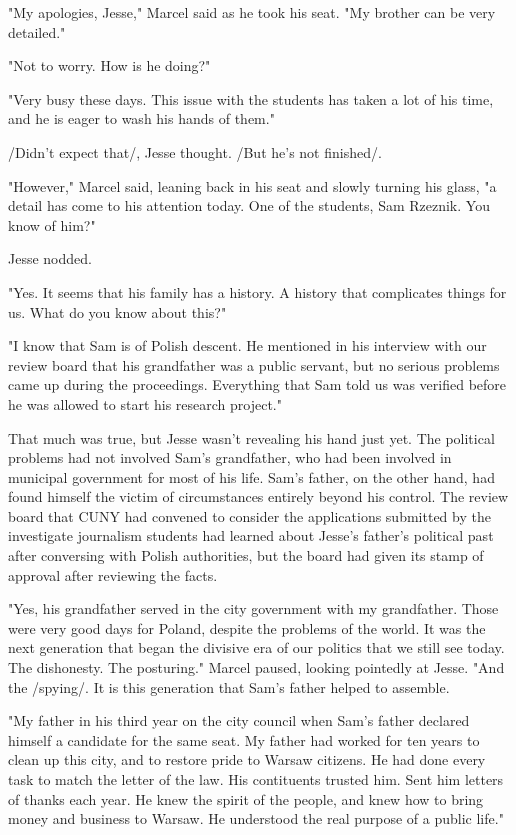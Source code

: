 "My apologies, Jesse," Marcel said as he took his seat.  "My brother can be very detailed."

"Not to worry.  How is he doing?"

"Very busy these days.  This issue with the students has taken a lot of his time, and he is eager to wash his hands of them."

/Didn't expect that/, Jesse thought.  /But he's not finished/.

"However," Marcel said, leaning back in his seat and slowly turning his glass, "a detail has come to his attention today.  One of the students, Sam Rzeznik.  You know of him?"

Jesse nodded.

"Yes.  It seems that his family has a history.  A history that complicates things for us.  What do you know about this?"

"I know that Sam is of Polish descent.  He mentioned in his interview with our review board that his grandfather was a public servant, but no serious problems came up during the proceedings.  Everything that Sam told us was verified before he was allowed to start his research project."

That much was true, but Jesse wasn't revealing his hand just yet.  The political problems had not involved Sam's grandfather, who had been involved in municipal government for most of his life.  Sam's father, on the other hand, had found himself the victim of circumstances entirely beyond his control.  The review board that CUNY had convened to consider the applications submitted by the investigate journalism students had learned about Jesse's father's political past after conversing with Polish authorities, but the board had given its stamp of approval after reviewing the facts.

"Yes, his grandfather served in the city government with my grandfather.  Those were very good days for Poland, despite the problems of the world.  It was the next generation that began the divisive era of our politics that we still see today.  The dishonesty.  The posturing."  Marcel paused, looking pointedly at Jesse.  "And the /spying/.  It is this generation that Sam's father helped to assemble.

"My father in his third year on the city council when Sam's father declared himself a candidate for the same seat.  My father had worked for ten years to clean up this city, and to restore pride to Warsaw citizens.  He had done every task to match the letter of the law.  His contituents trusted him.  Sent him letters of thanks each year.  He knew the spirit of the people, and knew how to bring money and business to Warsaw.  He understood the real purpose of a public life."

